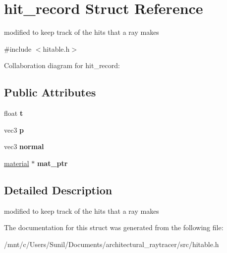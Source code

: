 \hypertarget{structhit__record}{}\section{hit\+\_\+record Struct Reference}
\label{structhit__record}


modified to keep track of the \textquotesingle{}hits\textquotesingle{} that a ray makes  




{\ttfamily \#include $<$hitable.\+h$>$}



Collaboration diagram for hit\+\_\+record\+:
\subsection*{Public Attributes}
\begin{DoxyCompactItemize}
\item 
\mbox{\label{structhit__record_a7f01fe93ab07f09e943f772c8f4d86b4}} 
float {\bfseries t}
\item 
\mbox{\label{structhit__record_af0d915768e7418302348430cb788836b}} 
vec3 {\bfseries p}
\item 
\mbox{\label{structhit__record_a13e119913532f25f57679403759bccfa}} 
vec3 {\bfseries normal}
\item 
\mbox{\label{structhit__record_a6578f1320cbf589873522f932f668a89}} 
\hyperlink{classmaterial}{material} $\ast$ {\bfseries mat\+\_\+ptr}
\end{DoxyCompactItemize}


\subsection{Detailed Description}
modified to keep track of the \textquotesingle{}hits\textquotesingle{} that a ray makes 

The documentation for this struct was generated from the following file\+:\begin{DoxyCompactItemize}
\item 
/mnt/c/\+Users/\+Sunil/\+Documents/architectural\+\_\+raytracer/src/hitable.\+h\end{DoxyCompactItemize}
